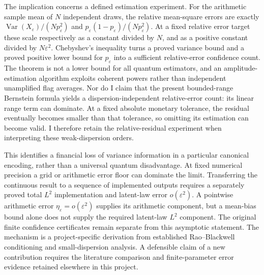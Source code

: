 The implication concerns a defined estimation experiment. For the
arithmetic sample mean of $N$ independent draws,
the relative mean-square errors are exactly
$\operatorname{Var}(X_\varepsilon)/(Np_\varepsilon^2)$ and
$p_\varepsilon(1-p_\varepsilon)/(Np_\varepsilon^2)$.
At a fixed relative error target these scale respectively as a constant
divided by $N$, and as a positive constant divided by
$N\varepsilon^2$. Chebyshev's inequality turns a proved variance bound
and a proved positive lower bound for $p_\varepsilon$ into a sufficient
relative-error confidence count. The theorem is not a lower bound for
all quantum estimators, and an amplitude-estimation algorithm exploits
coherent powers rather than independent unamplified flag averages.
Nor do I claim that the present bounded-range Bernstein formula yields
a dispersion-independent relative-error count: its linear range term
can dominate. At a fixed absolute monetary tolerance, the residual
eventually becomes smaller than that tolerance, so omitting its
estimation can become valid. I therefore retain the relative-residual
experiment when interpreting these weak-dispersion orders.

This identifies a financial loss of variance information in a particular
canonical encoding, rather than a universal quantum disadvantage.
At fixed numerical precision a grid or arithmetic error floor can dominate
the limit. Transferring the continuous result to a sequence of implemented
outputs requires a separately proved total $L^2$ implementation and
latent-law error $o(\varepsilon^2)$. A pointwise arithmetic error
$\eta_\varepsilon=o(\varepsilon^2)$ supplies its arithmetic component,
but a mean-bias bound alone does not supply the required latent-law
$L^2$ component. The original finite confidence certificates remain
separate from this asymptotic statement.
The mechanism is a project-specific derivation from established
Rao--Blackwell conditioning and small-dispersion analysis. A defensible
claim of a new contribution requires the literature comparison and
finite-parameter error evidence retained elsewhere in this project.
